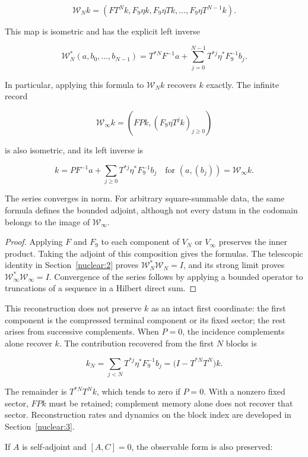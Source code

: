 \[
\mathcal W_Nk=\left(FT^Nk,F_9\eta k,F_9\eta Tk,\ldots,F_9\eta T^{N-1}k\right).
\]

\begin{theorem}
This map is isometric and has the explicit left inverse

\[
\mathcal W_N^*(a,b_0,\ldots,b_{N-1})
=T^{*N}F^{-1}a+
\sum_{j=0}^{N-1}T^{*j}\eta^*F_9^{-1}b_j.
\]

In particular, applying this formula to \(\mathcal W_Nk\) recovers \(k\) exactly. The infinite record

\[
\mathcal W_\infty k=\left(FPk,(F_9\eta T^jk)_{j\ge0}\right)
\]

is also isometric, and its left inverse is

\[
k=PF^{-1}a+\sum_{j\ge0}T^{*j}\eta^*F_9^{-1}b_j
\quad\text{for }(a,(b_j))=\mathcal W_\infty k.
\]

The series converges in norm. For arbitrary square-summable data, the same formula defines the bounded adjoint, although not every datum in the codomain belongs to the image of \(\mathcal W_\infty\).
\end{theorem}

\begin{proof}
Applying \(F\) and \(F_9\) to each component of \(V_N\) or \(V_\infty\) preserves the inner product. Taking the adjoint of this composition gives the formulas. The telescopic identity in Section~\ref{nuclear:2} proves \(\mathcal W_N^*\mathcal W_N=I\), and its strong limit proves \(\mathcal W_\infty^*\mathcal W_\infty=I\). Convergence of the series follows by applying a bounded operator to truncations of a sequence in a Hilbert direct sum.
\end{proof}

This reconstruction does not preserve \(k\) as an intact first coordinate: the first component is the compressed terminal component or its fixed sector; the rest arises from successive complements. When \(P=0\), the incidence complements alone recover \(k\). The contribution recovered from the first \(N\) blocks is

\[
k_N=\sum_{j<N}T^{*j}\eta^*F_9^{-1}b_j
=\bigl(I-T^{*N}T^N\bigr)k.
\]

The remainder is \(T^{*N}T^Nk\), which tends to zero if \(P=0\). With a nonzero fixed sector, \(FPk\) must be retained; complement memory alone does not recover that sector. Reconstruction rates and dynamics on the block index are developed in Section~\ref{nuclear:3}.

If \(A\) is self-adjoint and \([A,C]=0\), the observable form is also preserved:

